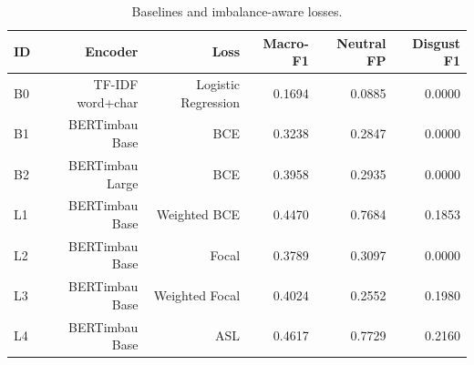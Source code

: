 \begin{table}[t]
\centering
\small
\caption{Baselines and imbalance-aware losses.}
\label{tab:baselines-losses}
\begin{tabular}{lrrrrr}
\toprule
ID & Encoder & Loss & Macro-F1 & Neutral FP & Disgust F1 \\
\midrule
B0 & TF-IDF word+char & Logistic Regression & 0.1694 & 0.0885 & 0.0000 \\
B1 & BERTimbau Base & BCE & 0.3238 & 0.2847 & 0.0000 \\
B2 & BERTimbau Large & BCE & 0.3958 & 0.2935 & 0.0000 \\
L1 & BERTimbau Base & Weighted BCE & 0.4470 & 0.7684 & 0.1853 \\
L2 & BERTimbau Base & Focal & 0.3789 & 0.3097 & 0.0000 \\
L3 & BERTimbau Base & Weighted Focal & 0.4024 & 0.2552 & 0.1980 \\
L4 & BERTimbau Base & ASL & 0.4617 & 0.7729 & 0.2160 \\
\bottomrule
\end{tabular}
\end{table}
